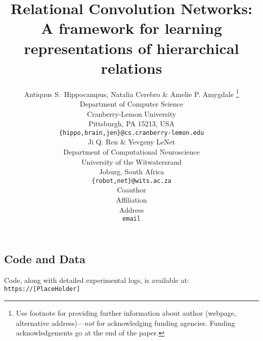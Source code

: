 \documentclass{article}
\title{Relational Convolution Networks: A framework for learning representations of hierarchical relations}
\author{Antiquus S.~Hippocampus, Natalia Cerebro \& Amelie P. Amygdale \thanks{ Use footnote for providing further information
about author (webpage, alternative address)---\emph{not} for acknowledging
funding agencies.  Funding acknowledgements go at the end of the paper.} \\
Department of Computer Science\\
Cranberry-Lemon University\\
Pittsburgh, PA 15213, USA \\
\texttt{\{hippo,brain,jen\}@cs.cranberry-lemon.edu} \\
\And
Ji Q. Ren \& Yevgeny LeNet \\
Department of Computational Neuroscience \\
University of the Witwatersrand \\
Joburg, South Africa \\
\texttt{\{robot,net\}@wits.ac.za} \\
\AND
Coauthor \\
Affiliation \\
Address \\
\texttt{email}
}
\begin{document}
\maketitle













% 



\subsection*{Code and Data}
Code, along with detailed experimental logs, is available at: \texttt{https://[PlaceHolder]}

\medskip

\clearpage
{%



}

\clearpage
\appendix

\end{document}
